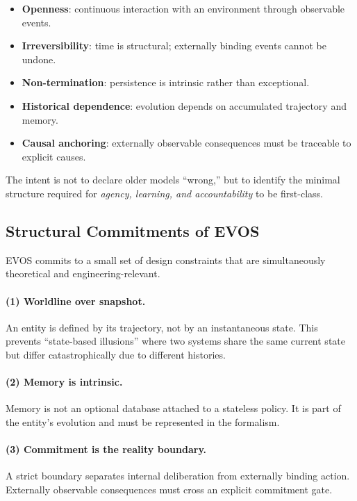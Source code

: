 \documentclass[11pt]{article}
\begin{document}
\begin{itemize}
  \item \textbf{Openness}: continuous interaction with an environment through observable events.
  \item \textbf{Irreversibility}: time is structural; externally binding events cannot be undone.
  \item \textbf{Non-termination}: persistence is intrinsic rather than exceptional.
  \item \textbf{Historical dependence}: evolution depends on accumulated trajectory and memory.
  \item \textbf{Causal anchoring}: externally observable consequences must be traceable to explicit causes.
\end{itemize}

The intent is not to declare older models ``wrong,'' but to identify the minimal structure
required for \emph{agency, learning, and accountability} to be first-class.

\vspace{0.75em}
\subsection{Structural Commitments of EVOS}

EVOS commits to a small set of design constraints that are simultaneously theoretical and
engineering-relevant.

\paragraph{(1) Worldline over snapshot.}
An entity is defined by its trajectory, not by an instantaneous state. This prevents
``state-based illusions'' where two systems share the same current state but differ
catastrophically due to different histories.

\paragraph{(2) Memory is intrinsic.}
Memory is not an optional database attached to a stateless policy. It is part of the
entity's evolution and must be represented in the formalism.

\paragraph{(3) Commitment is the reality boundary.}
A strict boundary separates internal deliberation from externally binding action.
Externally observable consequences must cross an explicit commitment gate.
\end{document}
